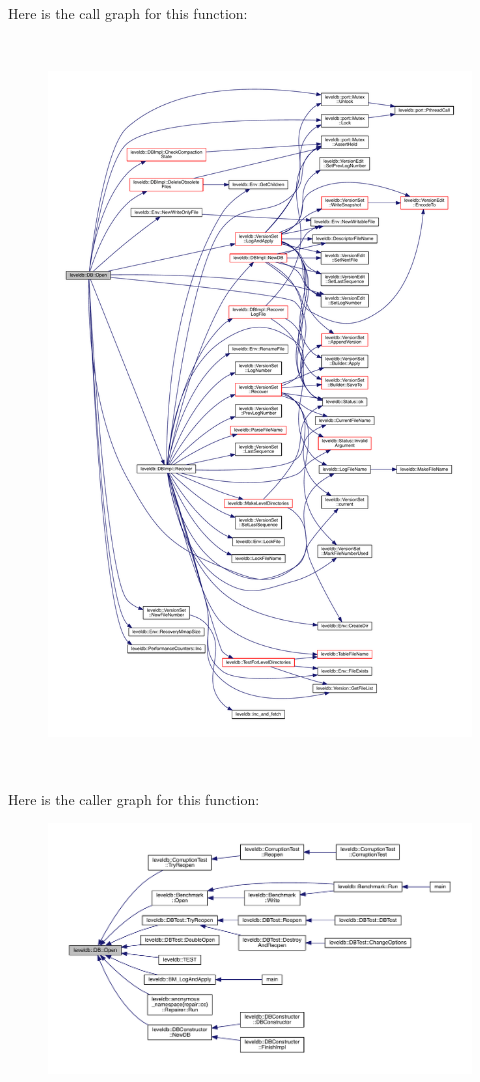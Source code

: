 Here is the call graph for this function\+:\nopagebreak
\begin{figure}[H]
\begin{center}
\leavevmode
\includegraphics[height=550pt]{classleveldb_1_1_d_b_ac1da2b48e911287d86f3a3bfa0f851fe_cgraph}
\end{center}
\end{figure}




Here is the caller graph for this function\+:
\nopagebreak
\begin{figure}[H]
\begin{center}
\leavevmode
\includegraphics[width=350pt]{classleveldb_1_1_d_b_ac1da2b48e911287d86f3a3bfa0f851fe_icgraph}
\end{center}
\end{figure}


